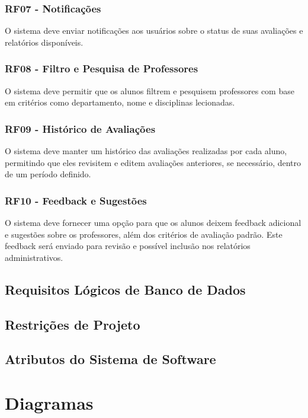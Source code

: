 \documentclass[12pt]{article}
\begin{document}
    \subsubsection{RF07 - Notificações}
        O sistema deve enviar notificações aos usuários sobre o status de suas avaliações e relatórios disponíveis.
    \subsubsection{RF08 - Filtro e Pesquisa de Professores}
        O sistema deve permitir que os alunos filtrem e pesquisem professores com base em critérios como departamento, nome e disciplinas lecionadas.
    \subsubsection{RF09 - Histórico de Avaliações}
        O sistema deve manter um histórico das avaliações realizadas por cada aluno, permitindo que eles revisitem e editem avaliações anteriores, se necessário, dentro de um período definido.
    \subsubsection{RF10 - Feedback e Sugestões}
        O sistema deve fornecer uma opção para que os alunos deixem feedback adicional e sugestões sobre os professores, além dos critérios de avaliação padrão. Este feedback será enviado para revisão e possível inclusão nos relatórios administrativos.

\subsection{Requisitos Lógicos de Banco de Dados}
\subsection{Restrições de Projeto}
\subsection{Atributos do Sistema de Software}


\newpage
\section{Diagramas}
\end{document}
